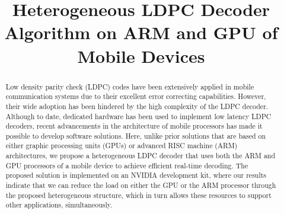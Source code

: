 \documentclass[conference]{IEEEtran}
\begin{document}
\title{Heterogeneous LDPC Decoder Algorithm on ARM and GPU of Mobile Devices}

\author{
\and
{}
}



\maketitle

\begin{abstract}

Low density parity check (LDPC) codes have been extensively applied in mobile communication systems due to their excellent error correcting capabilities. However, their wide adoption has been hindered by the high complexity of the LDPC decoder. Although to date, dedicated hardware has been used to implement low latency LDPC decoders, recent advancements in the architecture of mobile processors has made it possible to develop software solutions. Here, unlike prior solutions that are based on either graphic processing units (GPUs) or advanced RISC machine (ARM) architectures, we propose a heterogeneous LDPC decoder that uses both the ARM and GPU processors of a mobile device to achieve efficient real-time decoding. The proposed solution is implemented on an NVIDIA development kit, where our results indicate that we can reduce the load on either the GPU or the ARM processor through the proposed heterogeneous structure, which in turn allows these resources to support other applications, simultaneously.

\end{abstract}


\IEEEpeerreviewmaketitle
\end{document}
